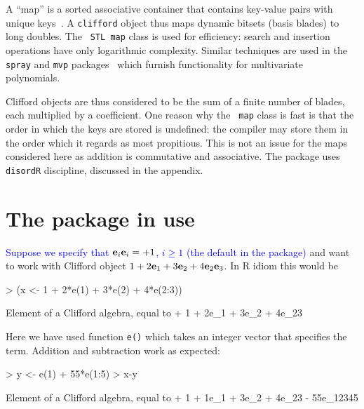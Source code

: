 \documentclass{birkjour}
\theoremstyle{definition}
\theoremstyle{remark}
\numberwithin{equation}{section}
\begin{document}
A ``map'' is a sorted associative container that contains key-value
pairs with unique keys~\cite{musser2009}.  A {\tt clifford} object
thus maps dynamic bitsets (basis blades) to long doubles.  The {\tt
  STL map} class is used for efficiency: search and insertion
operations have only logarithmic complexity.  Similar techniques are
used in the {\tt spray} and {\tt mvp}
packages~\cite{hankin2022_mvp,hankin2022_spray} which furnish
functionality for multivariate polynomials.

Clifford objects are thus considered to be the sum of a finite number
of blades, each multiplied by a coefficient.  One reason why the {\tt
  map} class is fast is that the order in which the keys are stored is
undefined: the compiler may store them in the order which it regards
as most propitious.  This is not an issue for the maps considered here
as addition is commutative and associative.  The
package uses {\tt disordR} discipline, discussed in the appendix.


\section{The package in use}

\textcolor{blue}{Suppose we specify that ${\bf e}_{i}{\bf e}_{i}=+1$,
  $i\geqslant 1$ (the default in the package)} and want to work with
Clifford object $1+2{\bf e}_{1}+3{\bf e}_{2}+4{\bf e}_{2}{\bf e}_{3}$.  In R idiom this
would be

\begin{Schunk}
\begin{Sinput}
> (x <- 1 + 2*e(1) + 3*e(2) + 4*e(2:3))
\end{Sinput}
\begin{Soutput}
Element of a Clifford algebra, equal to
+ 1 + 2e_1 + 3e_2 + 4e_23
\end{Soutput}
\end{Schunk}

Here we have used function {\tt e()} which takes an integer vector that
specifies the term.  Addition and subtraction work as expected:

\begin{Schunk}
\begin{Sinput}
> y <- e(1) + 55*e(1:5)
> x-y
\end{Sinput}
\begin{Soutput}
Element of a Clifford algebra, equal to
+ 1 + 1e_1 + 3e_2 + 4e_23 - 55e_12345
\end{Soutput}
\end{Schunk}
\end{document}
